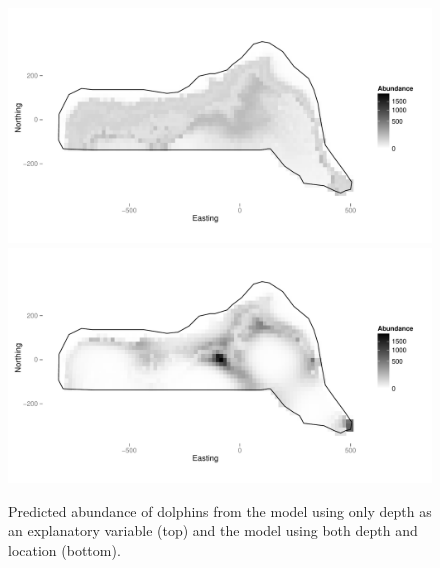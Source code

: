 \documentclass[a4paper,12pt]{article}
\begin{document}
\begin{figure}[h!]
  \caption{Predicted abundance of dolphins from the model using only depth as an explanatory variable (top) and the model using both depth and location (bottom).}
  \label{fits-depth}
  \begin{center}
    \includegraphics[width=\textwidth]{fit-depth}\\
    \includegraphics[width=\textwidth]{fit-depth-xy}
  \end{center}
\end{figure}

\newpage
\end{document}
